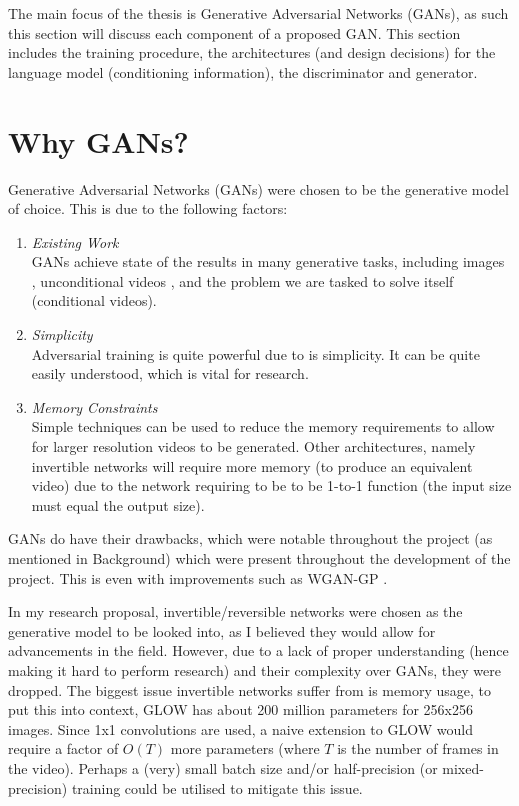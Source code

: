\documentclass{report}
\theoremstyle{plain}
\theoremstyle{definition}
\theoremstyle{remark}
\numberwithin{equation}{section}
\numberwithin{figure}{section}
\newcommand{\<}{\langle}
\renewcommand{\>}{\rangle}
\begin{document}
The main focus of the thesis is Generative Adversarial Networks (GANs), as such this section will discuss each component of a proposed GAN. This section includes the training procedure, the architectures (and design decisions) for the language model (conditioning information), the discriminator and generator.

\section{Why GANs?}

Generative Adversarial Networks (GANs) were chosen to be the generative model of choice. This is due to the following factors:

\begin{enumerate}
    \item \textit{Existing Work}\\
        GANs achieve state of the results in many generative tasks, including images \cite{zhang_stackgan++:_2017}, unconditional videos \cite{brock_large_2018}, and the problem we are tasked to solve itself \cite{pan_create_2018} (conditional videos).
    \item \textit{Simplicity}\\
        Adversarial training is quite powerful due to is simplicity. It can be quite easily understood, which is vital for research.
    \item \textit{Memory Constraints}\\
        Simple techniques can be used to reduce the memory requirements to allow for larger resolution videos to be generated. Other architectures, namely invertible networks \cite{kingma_glow:_2018} will require more memory (to produce an equivalent video) due to the network requiring to be to be 1-to-1 function (the input size must equal the output size).
\end{enumerate}

GANs do have their drawbacks, which were notable throughout the project (as mentioned in Background) which were present throughout the development of the project. This is even with improvements such as WGAN-GP \cite{gulrajani_improved_2017}.

In my research proposal, invertible/reversible networks \cite{jacobsen_i-revnet:_2018,kingma_glow:_2018} were chosen as the generative model to be looked into, as I believed they would allow for advancements in the field. However, due to a lack of proper understanding (hence making it hard to perform research) and their complexity over GANs, they were dropped. The biggest issue invertible networks suffer from is memory usage, to put this into context, GLOW \cite{kingma_glow:_2018} has about 200 million parameters for 256x256 images.  Since 1x1 convolutions are used, a naive extension to GLOW would require a factor of $O(T)$ more parameters (where $T$ is the number of frames in the video). Perhaps a (very) small batch size and/or half-precision (or mixed-precision) training could be utilised to mitigate this issue.
\end{document}
